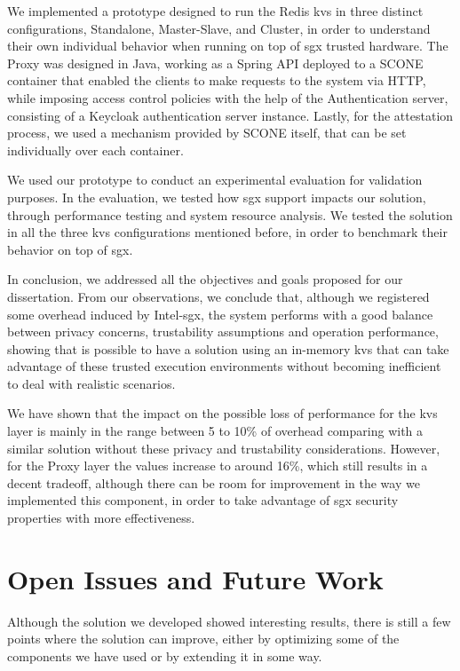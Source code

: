 We implemented a prototype designed to run the Redis \gls{kvs} in three distinct configurations, Standalone, Master-Slave, and Cluster, in order to understand their own individual behavior when running on top of \gls{sgx} trusted hardware. 
The Proxy was designed in Java, working as a Spring API deployed to a SCONE container that enabled the clients to make requests to the system via HTTP, while imposing access control policies with the help of the Authentication server, consisting of a Keycloak authentication server instance. 
Lastly, for the attestation process, we used a mechanism provided by SCONE itself, that can be set individually over each container.

We used our prototype to conduct an experimental evaluation for validation purposes. In the evaluation, we tested how \gls{sgx} support impacts our solution, through performance testing and system resource analysis. We tested the solution in all the three \gls{kvs} configurations mentioned before, in order to benchmark their behavior on top of \gls{sgx}.

In conclusion, we addressed all the objectives and goals proposed for our dissertation. From our observations, we conclude that, although we registered some overhead induced by Intel-\gls{sgx}, the system performs with a good balance between privacy concerns, trustability assumptions and operation performance, showing that is possible to have a solution using an in-memory \gls{kvs} that can take advantage of these trusted execution environments without becoming inefficient to deal with realistic scenarios.

We have shown that the impact on the possible loss of performance for the \gls{kvs} layer is mainly in the range between 5 to 10\% of overhead comparing with a similar solution without these privacy and trustability considerations. However, for the Proxy layer the values increase to around 16\%, which still results in a decent tradeoff, although there can be room for improvement in the way we implemented this component, in order to take advantage of \gls{sgx} security properties with more effectiveness.

\section{Open Issues and Future Work}

Although the solution we developed showed interesting results, there is still a few points where the solution can improve, either by optimizing some of the components we have used or by extending it in some way.

